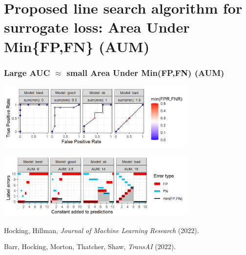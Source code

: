 \documentclass[t]{beamer}
\begin{document}
\section{Proposed line search algorithm for surrogate loss: Area Under Min\{FP,FN\} (AUM)}  

\begin{frame}
  \frametitle{Large AUC $\approx$ small Area Under Min(FP,FN) (AUM)} 
  
  \includegraphics[height=1.3in]{figure-more-than-one-binary-dots}

  \includegraphics[height=1.3in]{figure-more-than-one-binary-aum}

  Hocking, Hillman, \emph{Journal of Machine Learning Research} (2022).

  Barr, Hocking, Morton, Thatcher, Shaw, \emph{TransAI} (2022).
  
\end{frame}
\end{document}
